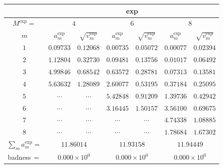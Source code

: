 \begin{tabular}{c|cc|cc|cc|}
&
\multicolumn{6}{|c|}{exp} \\
\hline
$M^{\exp}=$ &
 \multicolumn{2}{|c|}{$4$} &
 \multicolumn{2}{|c|}{$6$} &
 \multicolumn{2}{|c|}{$8$} \\
$m$ &
 $a^{\exp}_m$ & $\sqrt{v^{\exp}_m}$ &
 $a^{\exp}_m$ & $\sqrt{v^{\exp}_m}$ &
 $a^{\exp}_m$ & $\sqrt{v^{\exp}_m}$ \\
$1$ &
 $0.09733$ & $0.12068$ &
 $0.00735$ & $0.05072$ &
 $0.00077$ & $0.02394$ \\
$2$ &
 $1.12804$ & $0.32730$ &
 $0.09481$ & $0.13756$ &
 $0.01017$ & $0.06492$ \\
$3$ &
 $4.99846$ & $0.68542$ &
 $0.63572$ & $0.28781$ &
 $0.07313$ & $0.13581$ \\
$4$ &
 $5.63632$ & $1.28089$ &
 $2.60077$ & $0.53195$ &
 $0.37184$ & $0.25095$ \\
$5$ &
 $\cdots$ & $\cdots$ &
 $5.42848$ & $0.91209$ &
 $1.39736$ & $0.42942$ \\
$6$ &
 $\cdots$ & $\cdots$ &
 $3.16445$ & $1.50157$ &
 $3.56100$ & $0.69675$ \\
$7$ &
 $\cdots$ & $\cdots$ &
 $\cdots$ & $\cdots$ &
 $4.74338$ & $1.08885$ \\
$8$ &
 $\cdots$ & $\cdots$ &
 $\cdots$ & $\cdots$ &
 $1.78684$ & $1.67302$ \\
\hline
$\sum_m a^{\exp}_m=$ &
 \multicolumn{2}{|c|}{$11.86014$} &
 \multicolumn{2}{|c|}{$11.93158$} &
 \multicolumn{2}{|c|}{$11.94449$} \\
badness\,$=$ &
 \multicolumn{2}{|c|}{$0.000\times 10^{0}$} &
 \multicolumn{2}{|c|}{$0.000\times 10^{0}$} &
 \multicolumn{2}{|c|}{$0.000\times 10^{0}$} \\
\end{tabular}
